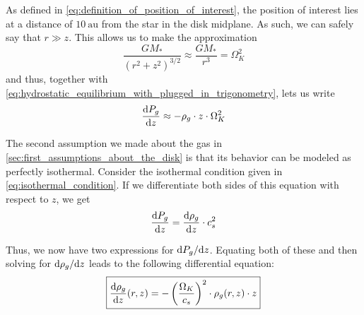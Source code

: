         As defined in \cref{eq:definition_of_position_of_interest}, the position of interest lies 
        at a distance of $10\ \text{au}$ from the star in the disk midplane. As such, we can safely
        say that $r\gg z$.
        This allows us to make the approximation
        \begin{equation}
            \frac{GM_*}{(r^2+z^2)^{3/2}} \approx \frac{GM_*}{r^3} = \Omega_K^2
        \end{equation}
        and thus, together with \cref{eq:hydrostatic_equilibrium_with_plugged_in_trigonometry},
        lets us write
        \begin{equation}
            \frac{\text{d} P_g}{\text{d} z} \approx -\rho_g \cdot z \cdot \Omega_K^2
        \end{equation}

        

        The second assumption we made about the gas in \cref{sec:first_assumptions_about_the_disk}
        is that its behavior can be modeled as perfectly isothermal. 
        Consider the isothermal condition given in \cref{eq:isothermal_condition}. If we 
        differentiate both sides of this equation with respect to $z$, we get
        \begin{equation}
            \frac{\text{d} P_g}{\text{d} z} = \frac{\text{d} \rho_g}{\text{d} z}\cdot c_s^2
        \end{equation}

        Thus, we now have two expressions for $\text dP_g/\text dz$. Equating both of these and then 
        solving for $\text d\rho_g/\text dz$ leads to the following differential equation:
        \begin{equation}
            \boxed{
                \frac{\text{d} \rho_g}{\text{d} z}(r,z) 
                = -\left(\frac{\Omega_K}{c_s}\right)^2 \cdot \rho_g(r,z) \cdot z
            }
        \end{equation}

